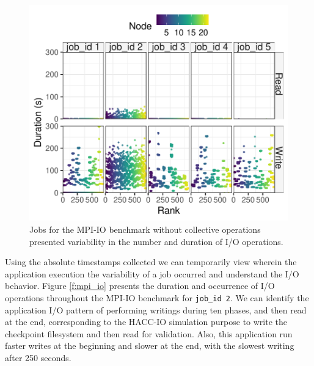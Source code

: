 \begin{figure}
	\centering
        \includegraphics[width=\linewidth]{figs/mpi_io_luster_no_coll_duration_allexperiments.pdf}
	\caption{Jobs for the MPI-IO benchmark without collective
          operations presented variability in the number and duration
          of I/O operations.}
	\label{f:mpi_io_all}
\end{figure}

Using the absolute timestamps collected we can temporarily view
wherein the application execution the variability of a job
occurred and understand the I/O behavior. Figure \ref{f:mpi_io} presents the duration and occurrence of
I/O operations throughout the MPI-IO benchmark for \texttt{job\_id
  2}. We can identify the application I/O pattern of performing
writings during ten phases, and then read at the end, corresponding to the HACC-IO simulation purpose to write the checkpoint filesystem and then read for validation. Also, this
application run faster writes at the beginning and slower at the end,
with the slowest writing after 250 seconds.
      
